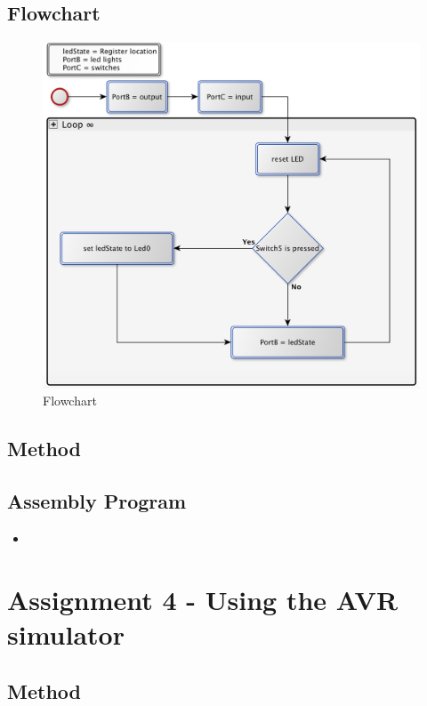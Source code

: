 \documentclass[a4paper, 12pt]{article}
\newcommand{\avrasm}[2]{
\begin{itemize}
\item[]
\end{itemize}
}
\begin{document}
\subsection{Flowchart}
\begin{figure}[h]
\centering
\includegraphics[scale=0.5]{Flowchart_pics/assignment3_pic.png} 
\caption{Flowchart}
\label{}
\end{figure}

\subsection{Method}

\newpage

\subsection{Assembly Program}
\avrasm{../src/a3.asm}{}
\newpage

\section{Assignment 4 - Using the AVR simulator}


\subsection{Method}

\newpage
\end{document}

